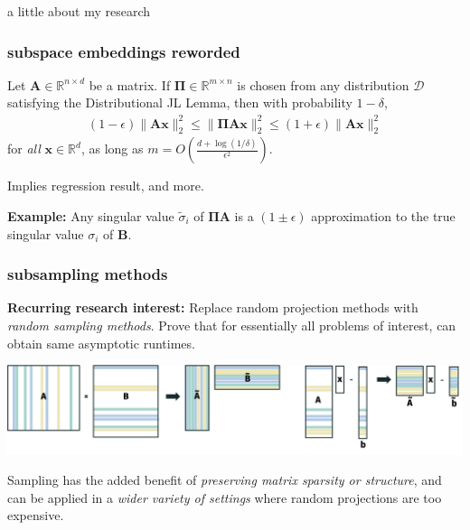 \documentclass[compress]{beamer}
\newcommand{\bs}[1]{\boldsymbol{#1}}
\newcommand{\bv}[1]{\mathbf{#1}}
\newcommand{\R}{\mathbb{R}}
\begin{document}
\begin{frame}[standout]
	\begin{center}
		\large a little about my research
	\end{center}
\end{frame}

\begin{frame}
	\frametitle{subspace embeddings reworded}
	\begin{theorem}
		Let $\bv{A} \in \R^{n\times d}$ be a matrix. If $\bs{\Pi}\in \R^{m\times n}$ is chosen from any distribution $\mathcal{D}$ satisfying the Distributional JL Lemma, then with probability $1-\delta$,
		\begin{align*}
			(1-\epsilon)\|\bv{A}\bv{x}\|_2^2 \leq \|\bs{\Pi} \bv{A} \bv{x}\|_2^2 \leq	(1+\epsilon)\|\bv{A}\bv{x}\|_2^2
		\end{align*}
		for \emph{all} $\bv{x} \in \R^d$, as long as  $m = {O}\left(\frac{d + \log(1/\delta)}{\epsilon^2}\right)$.
	\end{theorem}
	Implies regression result, and more. 
	
	\textbf{Example:} Any singular value $\tilde{\sigma}_i$ of $\bs{\Pi}\bv{A}$ is a $(1\pm \epsilon)$ approximation to the true singular value ${\sigma}_i$ of  $\bv{B}$. 
\end{frame}

\begin{frame}
	\frametitle{subsampling methods}
	\begin{center}
		\textbf{Recurring research interest:} Replace random projection methods with \emph{random sampling methods}. Prove that for essentially all problems of interest, can obtain same asymptotic runtimes. 
		
		\vspace{.5em}
		\includegraphics[width=\textwidth]{subsampling_high_level.png}
		
		Sampling has the added benefit of \emph{preserving matrix sparsity or structure}, and can be applied in a \emph{wider variety of settings} where random projections are too expensive.
	\end{center}
\end{frame}
\end{document}

